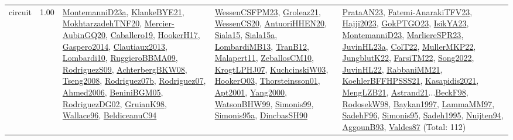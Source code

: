 {\begin{longtable}{p{3cm}r>{\raggedright\arraybackslash}p{6cm}>{\raggedright\arraybackslash}p{6cm}>{\raggedright\arraybackslash}p{8cm}}
\index{circuit}\index{Constraints!circuit}circuit &  1.00 & \hyperref[detail:MontemanniD23a]{MontemanniD23a}, \hyperref[detail:KlankeBYE21]{KlankeBYE21}, \hyperref[detail:MokhtarzadehTNF20]{MokhtarzadehTNF20}, \hyperref[detail:Mercier-AubinGQ20]{Mercier-AubinGQ20}, \hyperref[detail:Caballero19]{Caballero19}, \hyperref[detail:HookerH17]{HookerH17}, \hyperref[detail:Gaspero2014]{Gaspero2014}, \hyperref[detail:Clautiaux2013]{Clautiaux2013}, \hyperref[detail:Lombardi10]{Lombardi10}, \hyperref[detail:RuggieroBBMA09]{RuggieroBBMA09}, \hyperref[detail:RodriguezS09]{RodriguezS09}, \hyperref[detail:AchterbergBKW08]{AchterbergBKW08}, \hyperref[detail:Tseng2008]{Tseng2008}, \hyperref[detail:Rodriguez07b]{Rodriguez07b}, \hyperref[detail:Rodriguez07]{Rodriguez07}, \hyperref[detail:Ahmed2006]{Ahmed2006}, \hyperref[detail:BeniniBGM05]{BeniniBGM05}, \hyperref[detail:RodriguezDG02]{RodriguezDG02}, \hyperref[detail:GruianK98]{GruianK98}, \hyperref[detail:Wallace96]{Wallace96}, \hyperref[detail:BeldiceanuC94]{BeldiceanuC94} & \hyperref[detail:WessenCSFPM23]{WessenCSFPM23}, \hyperref[detail:Groleaz21]{Groleaz21}, \hyperref[detail:WessenCS20]{WessenCS20}, \hyperref[detail:AntuoriHHEN20]{AntuoriHHEN20}, \hyperref[detail:Siala15]{Siala15}, \hyperref[detail:Siala15a]{Siala15a}, \hyperref[detail:LombardiMB13]{LombardiMB13}, \hyperref[detail:TranB12]{TranB12}, \hyperref[detail:Malapert11]{Malapert11}, \hyperref[detail:ZeballosCM10]{ZeballosCM10}, \hyperref[detail:KrogtLPHJ07]{KrogtLPHJ07}, \hyperref[detail:KuchcinskiW03]{KuchcinskiW03}, \hyperref[detail:HookerO03]{HookerO03}, \hyperref[detail:Thorsteinsson01]{Thorsteinsson01}, \hyperref[detail:Apt2001]{Apt2001}, \hyperref[detail:Yang2000]{Yang2000}, \hyperref[detail:WatsonBHW99]{WatsonBHW99}, \hyperref[detail:Simonis99]{Simonis99}, \hyperref[detail:Simonis95a]{Simonis95a}, \hyperref[detail:DincbasSH90]{DincbasSH90} & \hyperref[detail:PrataAN23]{PrataAN23}, \hyperref[detail:Fatemi-AnarakiTFV23]{Fatemi-AnarakiTFV23}, \hyperref[detail:Hajji2023]{Hajji2023}, \hyperref[detail:GokPTGO23]{GokPTGO23}, \hyperref[detail:IsikYA23]{IsikYA23}, \hyperref[detail:MontemanniD23]{MontemanniD23}, \hyperref[detail:MarliereSPR23]{MarliereSPR23}, \hyperref[detail:JuvinHL23a]{JuvinHL23a}, \hyperref[detail:ColT22]{ColT22}, \hyperref[detail:MullerMKP22]{MullerMKP22}, \hyperref[detail:JungblutK22]{JungblutK22}, \hyperref[detail:FarsiTM22]{FarsiTM22}, \hyperref[detail:Song2022]{Song2022}, \hyperref[detail:JuvinHL22]{JuvinHL22}, \hyperref[detail:RabbaniMM21]{RabbaniMM21}, \hyperref[detail:KoehlerBFFHPSSS21]{KoehlerBFFHPSSS21}, \hyperref[detail:Kasapidis2021]{Kasapidis2021}, \hyperref[detail:MengLZB21]{MengLZB21}, \hyperref[detail:Astrand21]{Astrand21}...\hyperref[detail:BeckF98]{BeckF98}, \hyperref[detail:RodosekW98]{RodosekW98}, \hyperref[detail:Baykan1997]{Baykan1997}, \hyperref[detail:LammaMM97]{LammaMM97}, \hyperref[detail:SadehF96]{SadehF96}, \hyperref[detail:Simonis95]{Simonis95}, \hyperref[detail:Sadeh1995]{Sadeh1995}, \hyperref[detail:Nuijten94]{Nuijten94}, \hyperref[detail:AggounB93]{AggounB93}, \hyperref[detail:Valdes87]{Valdes87} (Total: 112)\\

\end{longtable}}
